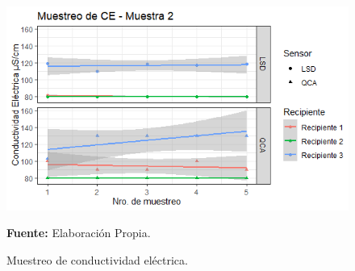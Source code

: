     \begin{figure}[H]
        \centering
        \includegraphics[width=0.75\linewidth]{Imagenes/cap4/CE_M2.png}
        \caption {Muestreo de conductividad el\'ectrica. }{\textbf{Fuente:}
        Elaboraci\'on Propia. }
        \label{fig:M2CE}
    \end{figure}

